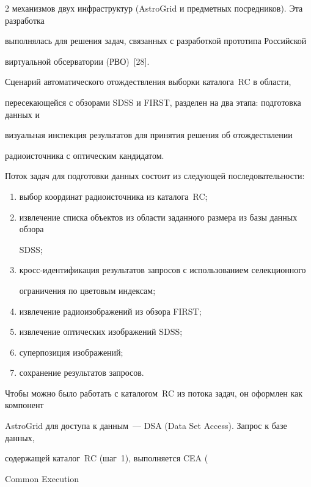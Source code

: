 \begin{multicols}{2}
механизмов двух инфраструктур (AstroGrid и предметных посредников). Эта разработка 

выполнялась для решения задач, связанных с разработкой прототипа Российской 

виртуальной обсерватории (РВО)~[28].

      

      Сценарий автоматического отождествления выборки каталога~RC в области, 

пересекающейся с обзорами SDSS и FIRST, разделен на два этапа: подготовка данных и 

визуальная инспекция результатов для принятия решения об отождествлении 

радиоисточника с оптическим кандидатом. 

      

      Поток задач для подготовки данных состоит из следующей последовательности: 

      \begin{enumerate}[(1)]

\item выбор координат радиоисточника из каталога~RC;

\item извлечение списка объектов из области заданного размера из базы данных обзора 

SDSS; 

\item кросс-идентификация результатов запросов с использованием селекционного 

ограничения по цветовым индексам; 

\item извлечение радиоизображений из обзора FIRST;

\item извлечение оптических изображений SDSS;

\item суперпозиция изображений;

\item сохранение результатов запросов. 

\end{enumerate}



Чтобы можно было работать с каталогом~RC из потока задач, он оформлен как компонент 

AstroGrid для доступа к данным~--- DSA ({Data Set Access}). Запрос к базе данных, 

содержащей каталог~RC (шаг~1), выполняется CEA ({Common Execution 

}
\end{multicols}
